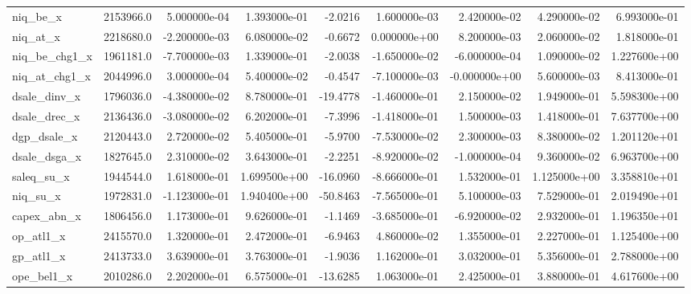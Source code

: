 \documentclass[12pt]{article}
\begin{document}
\begin{landscape}
\begin{longtable}{|l|r|r|r|r|r|r|r|r|}
niq\_be\_x                &  2153966.0 &  5.000000e-04 &  1.393000e-01 &     -2.0216 &  1.600000e-03 &  2.420000e-02 &  4.290000e-02 &  6.993000e-01 \\
niq\_at\_x                &  2218680.0 & -2.200000e-03 &  6.080000e-02 &     -0.6672 &  0.000000e+00 &  8.200000e-03 &  2.060000e-02 &  1.818000e-01 \\
niq\_be\_chg1\_x           &  1961181.0 & -7.700000e-03 &  1.339000e-01 &     -2.0038 & -1.650000e-02 & -6.000000e-04 &  1.090000e-02 &  1.227600e+00 \\
niq\_at\_chg1\_x           &  2044996.0 &  3.000000e-04 &  5.400000e-02 &     -0.4547 & -7.100000e-03 & -0.000000e+00 &  5.600000e-03 &  8.413000e-01 \\
dsale\_dinv\_x            &  1796036.0 & -4.380000e-02 &  8.780000e-01 &    -19.4778 & -1.460000e-01 &  2.150000e-02 &  1.949000e-01 &  5.598300e+00 \\
dsale\_drec\_x            &  2136436.0 & -3.080000e-02 &  6.202000e-01 &     -7.3996 & -1.418000e-01 &  1.500000e-03 &  1.418000e-01 &  7.637700e+00 \\
dgp\_dsale\_x             &  2120443.0 &  2.720000e-02 &  5.405000e-01 &     -5.9700 & -7.530000e-02 &  2.300000e-03 &  8.380000e-02 &  1.201120e+01 \\
dsale\_dsga\_x            &  1827645.0 &  2.310000e-02 &  3.643000e-01 &     -2.2251 & -8.920000e-02 & -1.000000e-04 &  9.360000e-02 &  6.963700e+00 \\
saleq\_su\_x              &  1944544.0 &  1.618000e-01 &  1.699500e+00 &    -16.0960 & -8.666000e-01 &  1.532000e-01 &  1.125000e+00 &  3.358810e+01 \\
niq\_su\_x                &  1972831.0 & -1.123000e-01 &  1.940400e+00 &    -50.8463 & -7.565000e-01 &  5.100000e-03 &  7.529000e-01 &  2.019490e+01 \\
capex\_abn\_x             &  1806456.0 &  1.173000e-01 &  9.626000e-01 &     -1.1469 & -3.685000e-01 & -6.920000e-02 &  2.932000e-01 &  1.196350e+01 \\
op\_atl1\_x               &  2415570.0 &  1.320000e-01 &  2.472000e-01 &     -6.9463 &  4.860000e-02 &  1.355000e-01 &  2.227000e-01 &  1.125400e+00 \\
gp\_atl1\_x               &  2413733.0 &  3.639000e-01 &  3.763000e-01 &     -1.9036 &  1.162000e-01 &  3.032000e-01 &  5.356000e-01 &  2.788000e+00 \\
ope\_bel1\_x              &  2010286.0 &  2.202000e-01 &  6.575000e-01 &    -13.6285 &  1.063000e-01 &  2.425000e-01 &  3.880000e-01 &  4.617600e+00 \\

\end{longtable}
\end{landscape}
\end{document}
